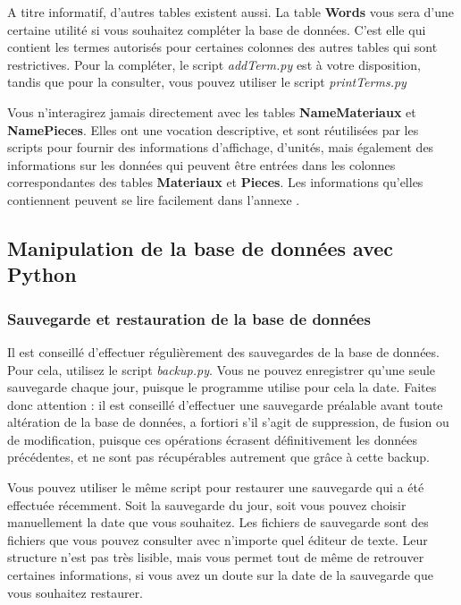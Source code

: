 \documentclass[12pt,a4paper]{article}
\begin{document}
        A titre informatif, d'autres tables existent aussi.
        La table \textbf{Words} vous sera d'une certaine utilité si vous souhaitez
        compléter la base de données. C'est elle qui contient les termes autorisés
        pour certaines colonnes des autres tables qui sont restrictives. Pour la
        compléter, le script \emph{addTerm.py} est à votre disposition, tandis que pour
        la consulter, vous pouvez utiliser le script \emph{printTerms.py}

        Vous n'interagirez jamais directement avec les tables \textbf{NameMateriaux}
        et \textbf{NamePieces}. Elles ont une vocation descriptive, et sont réutilisées
        par les scripts pour fournir des informations d'affichage, d'unités, mais également des
        informations sur les données qui peuvent être entrées dans les colonnes correspondantes
        des tables \textbf{Materiaux} et \textbf{Pieces}.
        Les informations qu'elles contiennent peuvent se lire facilement dans l'annexe
        .

    \bigskip
    \subsection{Manipulation de la base de données avec Python}
        \subsubsection{Sauvegarde et restauration de la base de données}\label{sauvegarde}

            Il est conseillé d'effectuer régulièrement des sauvegardes de la base de données.
            Pour cela, utilisez le script \emph{backup.py}. Vous ne pouvez enregistrer qu'une seule sauvegarde
            chaque jour, puisque le programme utilise pour cela la date. Faites donc attention : il est conseillé d'effectuer
            une sauvegarde préalable avant toute altération de la base de données, a fortiori s'il s'agit de suppression,
            de fusion ou de modification, puisque ces opérations écrasent définitivement les données précédentes, et ne sont
            pas récupérables autrement que grâce à cette backup.

            Vous pouvez utiliser le même script pour restaurer une sauvegarde qui a été effectuée récemment. Soit la sauvegarde
            du jour, soit vous pouvez choisir manuellement la date que vous souhaitez.
            Les fichiers de sauvegarde sont des fichiers que vous pouvez consulter avec n'importe quel éditeur de texte.
            Leur structure n'est pas très lisible, mais vous permet tout de même de retrouver certaines informations, si vous
            avez un doute sur la date de la sauvegarde que vous souhaitez restaurer.
\end{document}
